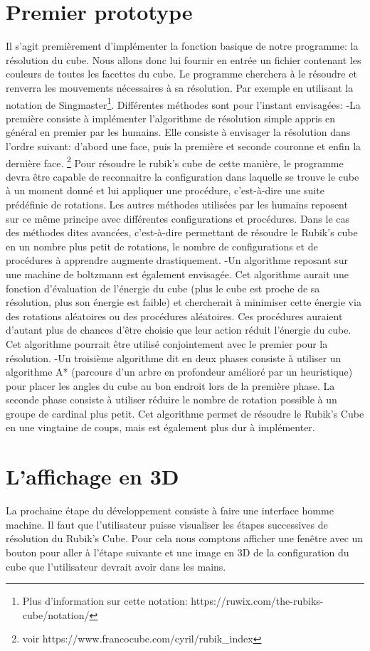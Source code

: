 \documentclass[a4paper]{report}
\begin{document}
\section{Premier prototype}
Il s'agit premièrement d'implémenter la fonction basique de notre programme: la résolution du cube. Nous allons donc lui fournir en entrée un fichier contenant les couleurs de toutes les facettes du cube. Le programme cherchera à le résoudre et renverra les mouvements nécessaires à sa résolution. Par exemple en utilisant la notation de Singmaster\footnote{Plus d'information sur cette notation: https://ruwix.com/the-rubiks-cube/notation/}.
Différentes méthodes sont pour l'instant envisagées:
	-La première consiste à implémenter l'algorithme de résolution simple appris en général en premier par les humains. Elle consiste à envisager la résolution dans l'ordre suivant: d'abord une face, puis la première et seconde couronne et enfin la dernière face. \footnote {voir https://www.francocube.com/cyril/rubik_index} Pour résoudre le rubik's cube de cette manière, le programme devra être capable de reconnaitre la configuration dans laquelle se trouve le cube à un moment donné et lui
    appliquer une procédure, c'est-à-dire une suite prédéfinie de rotations. Les autres méthodes utilisées par les humains reposent sur ce même principe avec différentes configurations et procédures. Dans le cas des méthodes dites avancées, c'est-à-dire permettant de résoudre le Rubik's cube en un nombre plus petit de rotations, le nombre de configurations et de procédures à apprendre augmente drastiquement.
	-Un algorithme reposant sur une machine de boltzmann est également envisagée. Cet algorithme aurait une fonction d'évaluation de l'énergie du cube (plus le cube est proche de sa résolution, plus son énergie est faible) et chercherait à minimiser cette énergie via des rotations aléatoires ou des procédures aléatoires. Ces procédures auraient d'autant plus de chances d'être choisie que leur action réduit l'énergie du cube. Cet algorithme pourrait être utilisé conjointement avec le premier pour la résolution.
	-Un troisième algorithme dit en deux phases consiste à utiliser un algorithme A* (parcours d'un arbre en profondeur amélioré par un heuristique) pour placer les angles du cube au bon endroit lors de la première phase. La seconde phase consiste à utiliser réduire le nombre de rotation possible à un groupe de cardinal plus petit. Cet algorithme permet de résoudre le Rubik's Cube en une vingtaine de coups, mais est également plus dur à implémenter.

\section{L'affichage en 3D}
La prochaine étape du développement consiste à faire une interface homme machine. Il faut que l'utilisateur puisse visualiser les étapes successives de résolution du Rubik's Cube. Pour cela nous comptons afficher une fenêtre avec un bouton pour aller à l'étape suivante et une image en 3D de la configuration du cube que l'utilisateur devrait avoir dans les mains.
\end{document}
